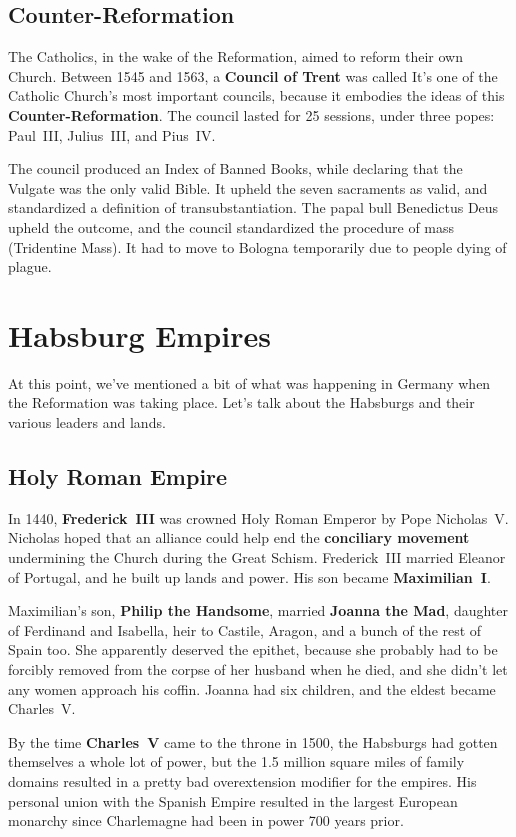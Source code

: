 \subsection*{Counter-Reformation}

The Catholics, in the wake of the Reformation, aimed to reform their own Church.
Between 1545 and 1563, a \textbf{Council of Trent} was called
It's one of the Catholic Church's most important councils,
because it embodies the ideas of this \textbf{Counter-Reformation}.
The council lasted for 25 sessions, under three popes: Paul~III, Julius~III, and Pius~IV\@.

The council produced an Index of Banned Books,
while declaring that the Vulgate was the only valid Bible.
It upheld the seven sacraments as valid,
and standardized a definition of transubstantiation.
The papal bull Benedictus Deus upheld the outcome,
and the council standardized the procedure of mass (Tridentine Mass).
It had to move to Bologna temporarily due to people dying of plague.

\section{Habsburg Empires}

At this point,
we've mentioned a bit of what was happening in Germany when the Reformation was taking place.
Let's talk about the Habsburgs and their various leaders and lands.

\subsection*{Holy Roman Empire}

In 1440, \textbf{Frederick~III} was crowned Holy Roman Emperor by Pope Nicholas~V.
Nicholas hoped that an alliance could help end the \textbf{conciliary movement}
undermining the Church during the Great Schism.
Frederick~III married Eleanor of Portugal, and he built up lands and power.
His son became \textbf{Maximilian~I}.

Maximilian's son, \textbf{Philip the Handsome},
married \textbf{Joanna the Mad}, daughter of Ferdinand and Isabella,
heir to Castile, Aragon, and a bunch of the rest of Spain too.
She apparently deserved the epithet,
because she probably had to be forcibly removed from the corpse of her husband when he died,
and she didn't let any women approach his coffin.
Joanna had six children, and the eldest became Charles~V.

By the time \textbf{Charles~V} came to the throne in 1500,
the Habsburgs had gotten themselves a whole lot of power,
but the 1.5 million square miles of family domains resulted in a pretty bad overextension modifier
for the empires.
His personal union with the Spanish Empire resulted in the largest European monarchy since
Charlemagne had been in power 700 years prior.

